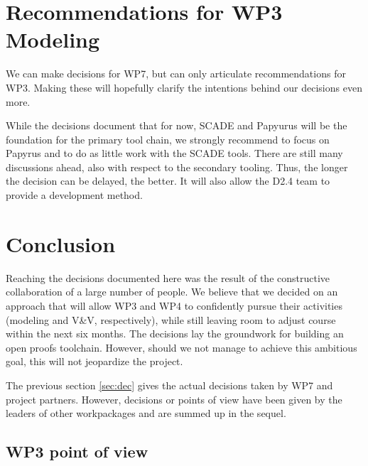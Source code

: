 
\section{Recommendations for WP3 Modeling}

We can make decisions for WP7, but can only articulate recommendations for WP3.  Making these will hopefully clarify the intentions behind our decisions even more.

While the decisions document that for now, SCADE and Papyurus will be the foundation for the primary tool chain, we strongly recommend to focus on Papyrus and to do as little work with the SCADE tools.  There are still many discussions ahead, also with respect to the secondary tooling.  Thus, the longer the decision can be delayed, the better.  It will also allow the D2.4 team to provide a development method.

\section{Conclusion}

Reaching the decisions documented here was the result of the constructive collaboration of a large number of people.  We believe that we decided on an approach that will allow WP3 and WP4 to confidently pursue their activities (modeling and V\&V, respectively), while still leaving room to adjust course within the next six months.  The decisions lay the groundwork for building an open proofs toolchain.  However, should we not manage to achieve this ambitious goal, this will not jeopardize the project.

The previous section \ref{sec:dec} gives the actual decisions taken by WP7 and project partners.
However, decisions or points of view have been given by the leaders of other workpackages and are summed up in the sequel.

\subsection{WP3 point of view}

